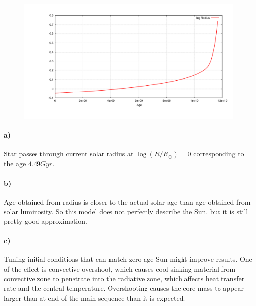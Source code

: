 \documentclass[12pt]{article}
\begin{document}
\subsection{}
\begin{figure}[!ht]
\begin{center}
\includegraphics[width=1.0\textwidth]{ex_1_4.png}
\end{center}
\vspace*{-10mm}
\caption{}
\label{fig:ex_1.4}
\end{figure}
\paragraph{a)}
Star passes through current solar radius at $\log{(R/R_{\odot})}=0$ corresponding to the age $4.49 Gyr$.
\paragraph{b)}
Age obtained from radius is closer to the actual solar age than age obtained from solar luminosity. So this model does not perfectly describe the Sun, but it is still pretty good approximation.
\paragraph{c)}
Tuning initial conditions that can match zero age Sun might improve results. One of the effect is convective overshoot, which causes cool sinking material from convective zone to penetrate into the radiative zone, which affects heat transfer rate and the central temperature. Overshooting causes the core mass to appear larger than at end of the main sequence than it is expected.
\end{document}
